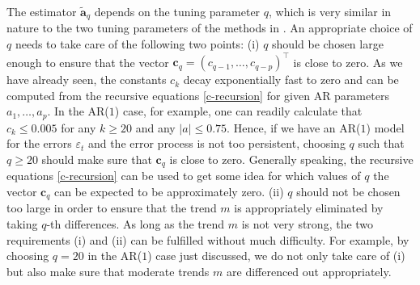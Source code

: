The estimator $\widetilde{\boldsymbol{a}}_q$ depends on the tuning parameter $q$, which is very similar in nature to the two tuning parameters of the methods in \cite{Hall2003}. An appropriate choice of $q$ needs to take care of the following two points: 
(i) $q$ should be chosen large enough to ensure that the vector $\boldsymbol{c}_q = (c_{q-1},\dots,c_{q-p})^\top$ is close to zero. As we have already seen, the constants $c_k$ decay exponentially fast to zero and can be computed from the recursive equations \eqref{c-recursion} for given AR parameters $a_1,\ldots,a_p$. In the AR($1$) case, for example, one can readily calculate that $c_k \le 0.005$ for any $k \ge 20$ and any $|a| \le 0.75$. Hence, if we have an AR($1$) model for the errors $\varepsilon_t$ and the error process is not too persistent, choosing $q$ such that $q \ge 20$ should make sure that $\boldsymbol{c}_q$ is close to zero. Generally speaking, the recursive equations \eqref{c-recursion} can be used to get some idea for which values of $q$ the vector $\boldsymbol{c}_q$ can be expected to be approximately zero. 
(ii) $q$ should not be chosen too large in order to ensure that the trend $m$ is appropriately eliminated by taking $q$-th differences. As long as the trend $m$ is not very strong, the two requirements (i) and (ii) can be fulfilled without much difficulty. For example, by choosing $q = 20$ in the AR($1$) case just discussed, we do not only take care of (i) but also make sure that moderate trends $m$ are differenced out appropriately. 


